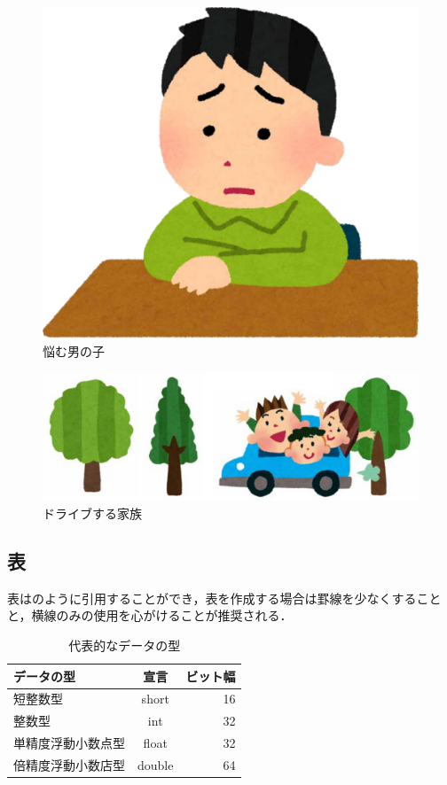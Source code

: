 \documentclass[a4paper,10pt,twocolumn,uplatex]{jsarticle}
\begin{document}
\begin{figure}[!tb]
  \centering
  \includegraphics[width=\linewidth]{img/sample1.pdf}
  \caption{悩む男の子}
  \label{fig:sample1}
\end{figure}

\begin{figure}[!tb]
  \centering
  \includegraphics[width=\linewidth]{img/sample2.pdf}
  \caption{ドライブする家族}
  \label{fig:sample2}
\end{figure}

\subsection{表}
表はのように引用することができ，表を作成する場合は罫線を少なくすることと，横線のみの使用を心がけることが推奨される．

\begin{table}[!bt]
  \caption{代表的なデータの型}
  \label{tab:data_type}
  \centering
  \begin{tabular}{lcr}
    \hline
    データの型         & 宣言   & ビット幅 \\
    \hline \hline
    短整数型           & short  & 16       \\
    整数型             & int    & 32       \\
    単精度浮動小数点型 & float  & 32       \\
    倍精度浮動小数店型 & double & 64       \\
    \hline
  \end{tabular}
\end{table}
\end{document}
